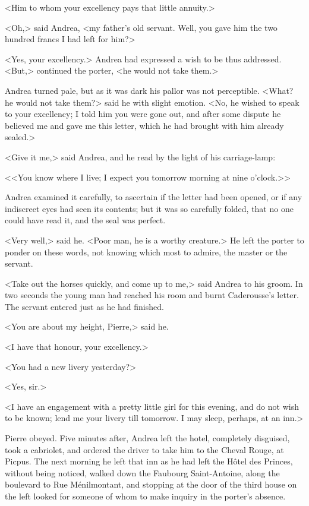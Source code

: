  <Him to whom your excellency pays that little annuity.> 

 <Oh,> said Andrea, <my father's old servant. Well, you gave him the two hundred francs I had left for him?> 

 <Yes, your excellency.> Andrea had expressed a wish to be thus addressed. <But,> continued the porter, <he would not take them.> 

 Andrea turned pale, but as it was dark his pallor was not perceptible. <What? he would not take them?> said he with slight emotion.  <No, he wished to speak to your excellency; I told him you were gone out, and after some dispute he believed me and gave me this letter, which he had brought with him already sealed.> 

 <Give it me,> said Andrea, and he read by the light of his carriage-lamp: 

 <<You know where I live; I expect you tomorrow morning at nine o'clock.>> 

 Andrea examined it carefully, to ascertain if the letter had been opened, or if any indiscreet eyes had seen its contents; but it was so carefully folded, that no one could have read it, and the seal was perfect. 

 <Very well,> said he. <Poor man, he is a worthy creature.> He left the porter to ponder on these words, not knowing which most to admire, the master or the servant. 

 <Take out the horses quickly, and come up to me,> said Andrea to his groom. In two seconds the young man had reached his room and burnt Caderousse's letter. The servant entered just as he had finished. 

 <You are about my height, Pierre,> said he. 

 <I have that honour, your excellency.> 

 <You had a new livery yesterday?> 

 <Yes, sir.> 

 <I have an engagement with a pretty little girl for this evening, and do not wish to be known; lend me your livery till tomorrow. I may sleep, perhaps, at an inn.> 

 Pierre obeyed. Five minutes after, Andrea left the hotel, completely disguised, took a cabriolet, and ordered the driver to take him to the Cheval Rouge, at Picpus. The next morning he left that inn as he had left the Hôtel des Princes, without being noticed, walked down the Faubourg Saint-Antoine, along the boulevard to Rue Ménilmontant, and stopping at the door of the third house on the left looked for someone of whom to make inquiry in the porter's absence. 

